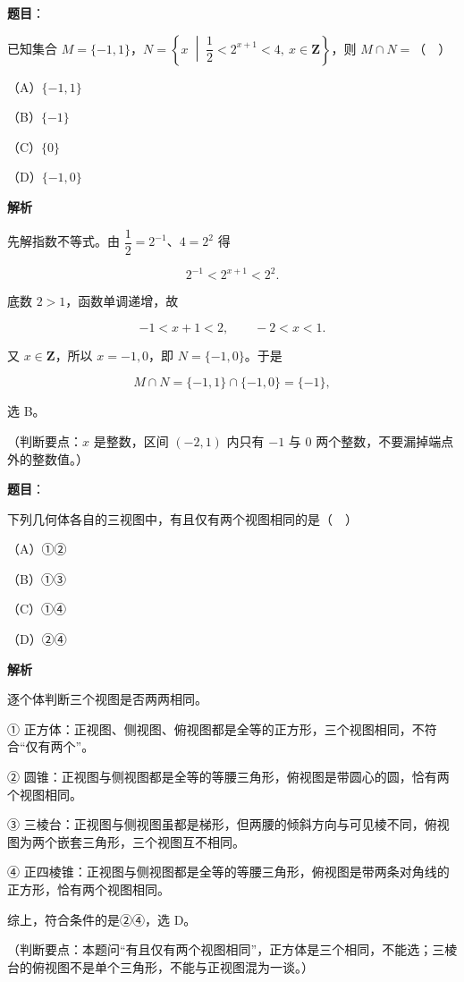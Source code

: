 \begin{answer}

\textbf{题目}：

已知集合 $M=\{-1,1\}$，$N=\left\{x\;\middle|\;\dfrac12<2^{x+1}<4,\ x\in\mathbf Z\right\}$，则 $M\cap N=$（　）

（A）$\{-1,1\}$

（B）$\{-1\}$

（C）$\{0\}$

（D）$\{-1,0\}$

\textbf{解析}

先解指数不等式。由 $\dfrac12=2^{-1}$、$4=2^2$ 得

\nopagebreak[4]
\[2^{-1}<2^{x+1}<2^2.\]

底数 $2>1$，函数单调递增，故

\nopagebreak[4]
\[-1<x+1<2,\qquad -2<x<1.\]

又 $x\in\mathbf Z$，所以 $x=-1,0$，即 $N=\{-1,0\}$。于是

\nopagebreak[4]
\[M\cap N=\{-1,1\}\cap\{-1,0\}=\{-1\},\]

选 B。

（判断要点：$x$ 是整数，区间 $(-2,1)$ 内只有 $-1$ 与 $0$ 两个整数，不要漏掉端点外的整数值。）


\end{answer}
\begin{answer}

\textbf{题目}：

下列几何体各自的三视图中，有且仅有两个视图相同的是（　）
\nopagebreak[4]
\begin{center}\end{center}
\nopagebreak[4]
（A）①②

（B）①③

（C）①④

（D）②④

\textbf{解析}

逐个体判断三个视图是否两两相同。

① 正方体：正视图、侧视图、俯视图都是全等的正方形，三个视图相同，不符合“仅有两个”。

② 圆锥：正视图与侧视图都是全等的等腰三角形，俯视图是带圆心的圆，恰有两个视图相同。

③ 三棱台：正视图与侧视图虽都是梯形，但两腰的倾斜方向与可见棱不同，俯视图为两个嵌套三角形，三个视图互不相同。

④ 正四棱锥：正视图与侧视图都是全等的等腰三角形，俯视图是带两条对角线的正方形，恰有两个视图相同。

综上，符合条件的是②④，选 D。

（判断要点：本题问“有且仅有两个视图相同”，正方体是三个相同，不能选；三棱台的俯视图不是单个三角形，不能与正视图混为一谈。）


\end{answer}
